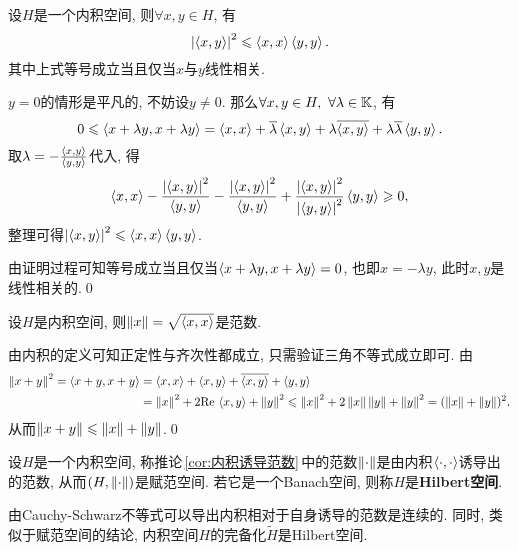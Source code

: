 \begin{Theorem}
	设$ H $是一个内积空间, 则$ \forall x,y\in H $, 有
	\[
		\left| \left\langle x,y \right\rangle \right| ^2\leqslant\left\langle x,x \right\rangle\left\langle y,y \right\rangle.
	\]
	其中上式等号成立当且仅当$ x $与$ y $线性相关.
\end{Theorem}
\begin{Proof}
	$ y=0 $的情形是平凡的, 不妨设$ y\ne 0 $. 那么$ \forall x,y\in H,\ \forall\lambda\in\K $, 有
	\[
		0\leqslant\left\langle x+\lambda y,x+\lambda y \right\rangle=\left\langle x,x \right\rangle+\overline{\lambda}\left\langle x,y \right\rangle+\lambda\overline{\left\langle x,y \right\rangle}+\lambda\overline{\lambda}\left\langle y,y \right\rangle.
	\]
	取$ \lambda=-\frac{\left\langle x,y \right\rangle}{\left\langle y,y \right\rangle} $代入, 得
	\[
		\left\langle x,x \right\rangle-\frac{\left| \left\langle x,y \right\rangle \right| ^2}{\left\langle y,y \right\rangle}-\frac{\left| \left\langle x,y \right\rangle \right| ^2}{\left\langle y,y \right\rangle}+\frac{\left| \left\langle x,y \right\rangle \right| ^2}{\left| \left\langle y,y \right\rangle \right| ^2}\left\langle y,y \right\rangle\geqslant 0,
	\]
	整理可得$ \left| \left\langle x,y \right\rangle \right| ^2\leqslant\left\langle x,x \right\rangle\left\langle y,y \right\rangle $.

	由证明过程可知等号成立当且仅当$ \left\langle x+\lambda y,x+\lambda y \right\rangle=0 $, 也即$ x=-\lambda y $, 此时$ x,y $是线性相关的.\qed
\end{Proof}

\begin{Corollary}\label{cor:内积诱导范数}
	设$ H $是内积空间, 则$ \left\| x \right\|=\sqrt{\left\langle x,x \right\rangle} $是范数.
\end{Corollary}
\begin{Proof}
	由内积的定义可知正定性与齐次性都成立, 只需验证三角不等式成立即可. 由
	\[
		\begin{aligned}
			\left\| x+y \right\|^2=\left\langle x+y,x+y \right\rangle & =\left\langle x,x \right\rangle+\left\langle x,y \right\rangle+\overline{\left\langle x,y \right\rangle}+\left\langle y,y \right\rangle                                             \\
			                               & =\left\| x \right\|^2+2\mathrm{Re\,}\left\langle x,y \right\rangle+\left\| y \right\|^2\leqslant\left\| x \right\|^2+2\left\| x \right\|\left\| y \right\|+\left\| y \right\|^2=(\left\| x \right\|+\left\| y \right\|)^2.
		\end{aligned}
	\]
	从而$ \left\| x+y \right\|\leqslant\left\| x \right\|+\left\| y \right\| $.\qed
\end{Proof}

\begin{Definition}[Hilbert空间]\label{def:Hilbert空间}
	设$ H $是一个内积空间, 称推论\,\ref{cor:内积诱导范数}\,中的范数$ \left\| \cdot \right\| $是由内积$ \left\langle \cdot,\cdot \right\rangle $诱导出的范数, 从而$ (H,\left\| \cdot \right\|) $是赋范空间. 若它是一个Banach空间, 则称$ H $是\textbf{Hilbert空间}.
\end{Definition}

由Cauchy-Schwarz不等式可以导出内积相对于自身诱导的范数是连续的. 同时, 类似于赋范空间的结论, 内积空间$ H $的完备化$ \tilde{H} $是Hilbert空间.

